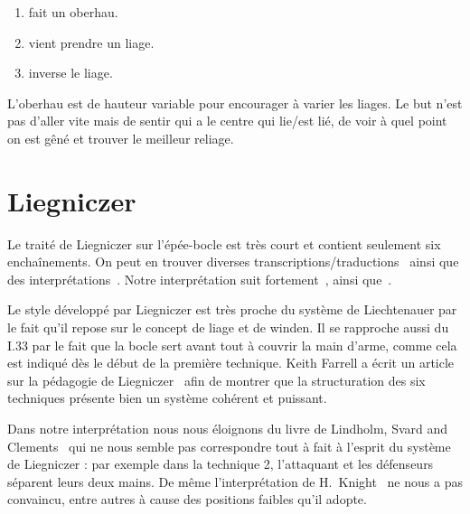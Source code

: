 \begin{exercice}[Liages]

\begin{enumerate}
	\item \A fait un oberhau.
	\item \D vient prendre un liage.
	\item \A inverse le liage.
\end{enumerate}

L'oberhau est de hauteur variable pour encourager \D à varier les liages.
Le but n'est pas d'aller vite mais de sentir qui a le centre qui lie/est lié, de voir à quel point on est gêné et trouver le meilleur reliage.

\end{exercice}



\section{Liegniczer}



Le traité de Liegniczer sur l'épée-bocle est très court et contient seulement six enchaînements.
On peut en trouver diverses transcriptions/traductions~\cite{ardamhe:liegniczer, farrell:liegnieczer, lindholm:ringeck_others:2006} ainsi que des interprétations~\cite{farrell:pedagogy_liegnieczer:2014, youtube:sala_armi:liegniczer, youtube:memag:liegniczer, lindholm:ringeck_others:2006, Myers:LiegniczerBuckler, knight:epee_bocle}.
Notre interprétation suit fortement~\cite{youtube:sala_armi:liegniczer, farrell:pedagogy_liegnieczer:2014}, ainsi que~\cite{youtube:memag:liegniczer}.

Le style développé par Liegniczer est très proche du système de Liechtenauer par le fait qu'il repose sur le concept de liage et de winden.
Il se rapproche aussi du I.33 par le fait que la bocle sert avant tout à couvrir la main d'arme, comme cela est indiqué dès le début de la première technique.
Keith Farrell a écrit un article sur la pédagogie de Liegniczer~\cite{farrell:pedagogy_liegnieczer:2014} afin de montrer que la structuration des six techniques présente bien un système cohérent et puissant.

Dans notre interprétation nous nous éloignons du livre de Lindholm, Svard and Clements~\cite{lindholm:ringeck_others:2006} qui ne nous semble pas correspondre tout à fait à l'esprit du système de Liegniczer : par exemple dans la technique 2, l'attaquant et les défenseurs séparent leurs deux mains.
De même l'interprétation de H.\ Knight~\cite[part I]{knight:epee_bocle} ne nous a pas convaincu, entre autres à cause des positions faibles qu'il adopte.

